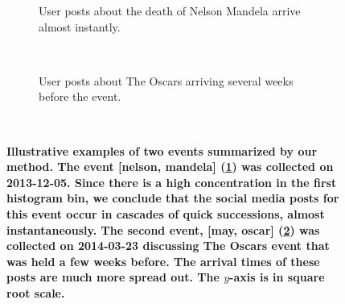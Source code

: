 \documentclass[10pt,letterpaper]{article}
\begin{document}
\begin{figure}[h]
  \centering
  \begin{subfigure}[b]{\textwidth}
    \caption{User posts about the death of Nelson Mandela arrive
      almost instantly.}
    \label{fig:nelson_mandela}
  \end{subfigure}%

  ~ %
  \begin{subfigure}[b]{\textwidth}
    \caption{User posts about The Oscars arriving several weeks before
      the event.}
    \label{fig:oscar}
  \end{subfigure}%
  ~ %

  \caption{\textbf{Illustrative examples of two events
      summarized by our method. The event [nelson, mandela] (\ref{fig:nelson_mandela}) was
      collected on 2013-12-05. Since there is a high
      concentration in the first histogram bin, we conclude that the social media posts
      for this event occur in cascades of quick successions, almost
      instantaneously. The second event, [may, oscar] (\ref{fig:oscar}) was collected
      on 2014-03-23 discussing The Oscars event that was held a few
      weeks before. The arrival times of these posts are much more spread
      out. The $y$-axis is in square root scale.} 
  }
  \label{fig:example_buzz}
\end{figure}


\end{document}
